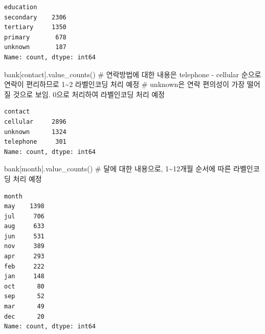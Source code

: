 \documentclass[
  a4paper,
  DIV=11,
  numbers=noendperiod]{scrreprt}
\newenvironment{Shaded}{\begin{snugshade}}{\end{snugshade}}
\newcommand{\CommentTok}[1]{\textcolor[rgb]{0.37,0.37,0.37}{#1}}
\newcommand{\NormalTok}[1]{\textcolor[rgb]{0.00,0.23,0.31}{#1}}
\newcommand{\StringTok}[1]{\textcolor[rgb]{0.13,0.47,0.30}{#1}}
\begin{document}
\begin{verbatim}
education
secondary    2306
tertiary     1350
primary       678
unknown       187
Name: count, dtype: int64
\end{verbatim}

\begin{Shaded}
\begin{Highlighting}[]
\NormalTok{bank[}\StringTok{\textquotesingle{}contact\textquotesingle{}}\NormalTok{].value\_counts()}
\CommentTok{\# 연락방법에 대한 내용은 telephone {-} cellular 순으로 연락이 편리하므로 1\textasciitilde{}2 라벨인코딩 처리 예정}
\CommentTok{\# unknown은 연락 편의성이 가장 떨어질 것으로 보임. 0으로 처리하여 라벨인코딩 처리 예정}
\end{Highlighting}
\end{Shaded}

\begin{verbatim}
contact
cellular     2896
unknown      1324
telephone     301
Name: count, dtype: int64
\end{verbatim}

\begin{Shaded}
\begin{Highlighting}[]
\NormalTok{bank[}\StringTok{\textquotesingle{}month\textquotesingle{}}\NormalTok{].value\_counts()}
\CommentTok{\# 달에 대한 내용으로, 1\textasciitilde{}12개월 순서에 따른 라벨인코딩 처리 예정}
\end{Highlighting}
\end{Shaded}

\begin{verbatim}
month
may    1398
jul     706
aug     633
jun     531
nov     389
apr     293
feb     222
jan     148
oct      80
sep      52
mar      49
dec      20
Name: count, dtype: int64
\end{verbatim}
\end{document}
